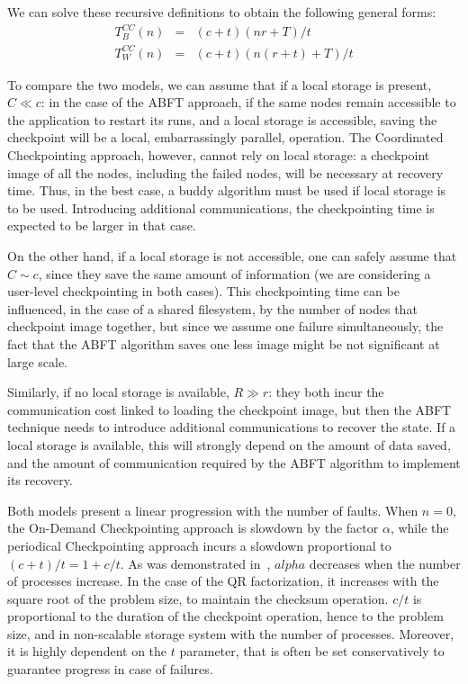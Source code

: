 We can solve these recursive definitions to obtain the following
general forms:
\begin{eqnarray}
T^{CC}_B(n) &= & (c+t)(n r +T)/t\\
T^{CC}_W(n) & = & (c+t) (n (r+t) + T) /t
\end{eqnarray}

To compare the two models, we can assume that if a local storage is
present, $C \ll c$: in the case of the ABFT approach, if the same
nodes remain accessible to the application to restart its runs, and a
local storage is accessible, saving the checkpoint will be a local,
embarrassingly parallel, operation. The Coordinated Checkpointing
approach, however, cannot rely on local storage: a checkpoint image of
all the nodes, including the failed nodes, will be necessary at
recovery time. Thus, in the best case, a buddy algorithm must be used
if local storage is to be used. Introducing additional communications,
the checkpointing time is expected to be larger in that case.

On the other hand, if a local storage is not accessible, one can
safely assume that $C \sim c$, since they save the same amount of
information (we are considering a user-level checkpointing in both
cases). This checkpointing time can be influenced, in the case of a
shared filesystem, by the number of nodes that checkpoint image
together, but since we assume one failure simultaneously, the fact
that the ABFT algorithm saves one less image might be not significant
at large scale.

Similarly, if no local storage is available, $R \gg r$: they both
incur the communication cost linked to loading the checkpoint image,
but then the ABFT technique needs to introduce additional
communications to recover the state. If a local storage is available,
this will strongly depend on the amount of data saved, and the amount
of communication required by the ABFT algorithm to implement its
recovery. 

Both models present a linear progression with the number of
faults. When $n=0$, the On-Demand Checkpointing approach is slowdown
by the factor $\alpha$, while the periodical Checkpointing approach
incurs a slowdown proportional to $(c+t)/t = 1+c/t$. As was
demonstrated in~\cite{lawn253}, $alpha$ decreases when the number of
processes increase. In the case of the QR factorization, it increases
with the square root of the problem size, to maintain the checksum
operation. $c/t$ is proportional to the duration of the checkpoint
operation, hence to the problem size, and in non-scalable storage
system with the number of processes. Moreover, it is highly dependent
on the $t$ parameter, that is often be set conservatively to guarantee
progress in case of failures.

